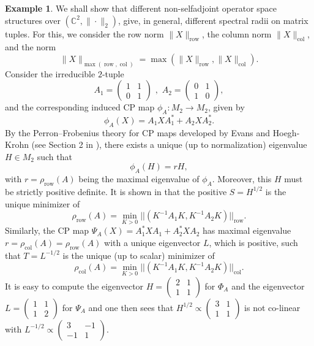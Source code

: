 \documentclass[12pt]{amsart}
\numberwithin{equation}{section}
\theoremstyle{definition}
\newtheorem{example}[theorem]{Example}
\newcommand{\bC}{\mathbb{C}}
\begin{document}
\begin{example}\label{ex:row_col_2}
We shall show that different non-selfadjoint operator space structures over $(\bC^2, \|\cdot\|_2)$, give, in general, different spectral radii on matrix tuples. 
For this, we consider the row norm $\|X\|_{\operatorname{row}}$, the column norm $\|X\|_{\operatorname{col}}$, and the norm 
\[
\|X\|_{\max(\operatorname{row},\operatorname{col})} = \max(\|X\|_{\operatorname{row}},\|X\|_{\operatorname{col}}). 
\]
Consider the irreducible $2$-tuple
\[
A_1 = \begin{pmatrix} 1 & 1 \\ 0 & 1 \end{pmatrix} \,\, , \,\, A_2 = \begin{pmatrix} 0 & 1 \\ 1 & 0 \end{pmatrix} , 
\]
and the corresponding induced CP map $\phi_A \colon M_2 \to M_2$, given by 
\[
\phi_A(X) = A_1 X A_1^* + A_2 X A_2^*. 
\]
By the Perron--Frobenius theory for CP maps developed by Evans and Hoegh-Krohn (see Section 2 in \cite{evans1978spectral}), there exists a unique (up to normalization) eigenvalue $H \in M_2$ such that 
\[
\phi_A(H) = rH , 
\]
with $r = \rho_{\operatorname{row}}(A)$ being the maximal eigenvalue of $\phi_A$. 
Moreover, this $H$ must be strictly positive definite. 
It is shown in \cite{evans1978spectral} that the positive $S = H^{1/2}$ is the unique minimizer of 
\[
\rho_{\operatorname{row}}(A) = \min_{K > 0} || (K^{-1}  A_1 K, K^{-1} A_2  K)||_{\operatorname{row}}.
\]
Similarly, the CP map $\Psi_A(X) = A_1^*X A_1 + A_2^* X A_2$ has maximal eigenvalue $r = \rho_{\operatorname{col}}(A) = \rho_{\operatorname{row}}(A)$ with a unique eigenvector $L$, which is positive, such that $T=L^{-1/2}$ is the unique (up to scalar) minimizer of
\[
\rho_{\operatorname{col}}(A) = \min_{K > 0} || (K^{-1}  A_1 K, K^{-1} A_2  K)||_{\operatorname{col}}.
\]
It is easy to compute the eigenvector $H = \left(\begin{smallmatrix} 2 & 1 \\ 1 & 1 \end{smallmatrix}\right)$ for $\Phi_A$ and the eigenvector $L = \left(\begin{smallmatrix} 1 & 1 \\ 1 & 2 \end{smallmatrix}\right)$ for $\Psi_A$ and one then sees that $H^{1/2} \propto \left(\begin{smallmatrix} 3 & 1 \\ 1 & 1 \end{smallmatrix}\right)$ is not co-linear with $L^{-1/2} \propto \left(\begin{smallmatrix} 3 & -1 \\ -1 & 1 \end{smallmatrix}\right)$. 

\end{example}
\end{document}

